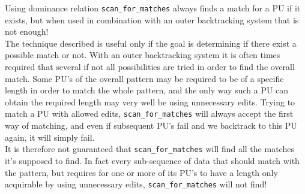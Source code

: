 \documentclass[12pt]{article}
\newcommand{\scm}{\texttt{scan\_for\_matches} }
\newcommand{\pu}{PU }
\newcommand{\pus}{PU's }
\begin{document}
\noindent Using dominance relation \scm always finds a match for a \pu if it exists, but when used in combination
with an outer backtracking system that is not enough! \\
The technique described is useful only if the goal is determining if there exist a possible match or not.
With an outer backtracking system it is often times required that several if not all possibilities are tried in
order to find the overall match. Some \pus of the overall pattern may be required to be of a specific length in order to
match the whole pattern, and the only way such a \pu can obtain the required length may very well be using unnecessary
edits. Trying to match a \pu with allowed edits, \scm will always accept the first way of matching, and even if
subsequent \pus fail and we backtrack to this \pu again, it will simply fail. \\
It is therefore not guaranteed that \scm will find all the matches it's supposed to find. In fact every sub-sequence
of data that should match with the pattern, but requires for one or more of its \pus to have a length only
acquirable by using unnecessary edits, \scm will not find!
\end{document}
